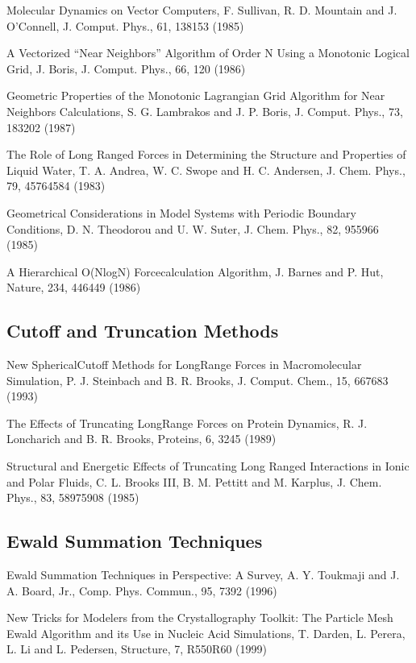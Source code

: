 \documentclass[letterpaper,11pt,english]{sphinxmanual}
\begin{document}
Molecular Dynamics on Vector Computers, F. Sullivan, R. D. Mountain and J. O’Connell, J. Comput. Phys., 61, 138\sphinxhyphen{}153 (1985)

A Vectorized “Near Neighbors” Algorithm of Order N Using a Monotonic Logical Grid, J. Boris, J. Comput. Phys., 66, 1\sphinxhyphen{}20 (1986)

Geometric Properties of the Monotonic Lagrangian Grid Algorithm for Near Neighbors Calculations, S. G. Lambrakos and J. P. Boris, J. Comput. Phys., 73, 183\sphinxhyphen{}202 (1987)

The Role of Long Ranged Forces in Determining the Structure and Properties of Liquid Water, T. A. Andrea, W. C. Swope and H. C. Andersen, J. Chem. Phys., 79, 4576\sphinxhyphen{}4584 (1983)

Geometrical Considerations in Model Systems with Periodic Boundary Conditions, D. N. Theodorou and U. W. Suter, J. Chem. Phys., 82, 955\sphinxhyphen{}966 (1985)

A Hierarchical O(NlogN) Force\sphinxhyphen{}calculation Algorithm, J. Barnes and P. Hut, Nature, 234, 446\sphinxhyphen{}449 (1986)


\subsection{Cutoff and Truncation Methods}
\label{\detokenize{text/references:cutoff-and-truncation-methods}}
New Spherical\sphinxhyphen{}Cutoff Methods for Long\sphinxhyphen{}Range Forces in Macromolecular Simulation, P. J. Steinbach and B. R. Brooks, J. Comput. Chem., 15, 667\sphinxhyphen{}683 (1993)

The Effects of Truncating Long\sphinxhyphen{}Range Forces on Protein Dynamics, R. J. Loncharich and B. R. Brooks, Proteins, 6, 32\sphinxhyphen{}45 (1989)

Structural and Energetic Effects of Truncating Long Ranged Interactions in Ionic and Polar Fluids, C. L. Brooks III, B. M. Pettitt and M. Karplus, J. Chem. Phys., 83, 5897\sphinxhyphen{}5908 (1985)


\subsection{Ewald Summation Techniques}
\label{\detokenize{text/references:ewald-summation-techniques}}
Ewald Summation Techniques in Perspective: A Survey, A. Y. Toukmaji and J. A. Board, Jr., Comp. Phys. Commun., 95, 73\sphinxhyphen{}92 (1996)

New Tricks for Modelers from the Crystallography Toolkit: The Particle Mesh Ewald Algorithm and its Use in Nucleic Acid Simulations, T. Darden, L. Perera, L. Li and L. Pedersen, Structure, 7, R550\sphinxhyphen{}R60 (1999)
\end{document}
